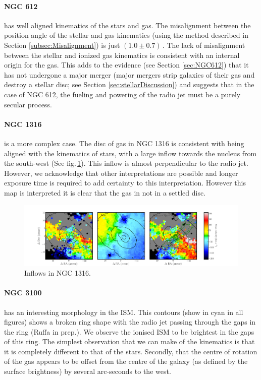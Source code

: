 	\paragraph{NGC 612} has well aligned kinematics of the stars and gas. The misalignment between the position angle of the stellar and gas kinematics (using the method described in Section \ref{subsec:Misalignment}) is just $(1.0\pm0.7)$\,\degree. The lack of misalignment between the stellar and ionized gas kinematics is consistent with an internal origin for the gas. This adds to the evidence (see Section \ref{sec:NGC612}) that it has not undergone a major merger (major mergers strip galaxies of their gas and destroy a stellar disc; see Section \ref{sec:stellarDiscussion}) and suggests that in the case of NGC 612, the fueling and powering of the radio jet must be a purely secular process. 


	\paragraph{NGC 1316} is a more complex case. The disc of gas in NGC 1316 is consistent with being aligned with the kinematics of stars, with a large inflow towards the nucleus from the south-west (See fig.\,\ref{fig:Inflow}). This inflow is almost perpendicular to the radio jet. However, we acknowledge that other interpretations are possible and longer exposure time is required to add certainty to this interpretation. However this map is interpreted it is clear that the gas in not in a settled disc. 

	\begin{figure}
		\centering
		\includegraphics[width=\textwidth]{chapter5/ngc1316_inflow.png}
		\caption[Inflows in NGC 1316]{Inflows in NGC 1316.} 
		\label{fig:Inflow}
	\end{figure}


	\paragraph{NGC 3100} has an interesting morphology in the ISM. This  contours (show in cyan in all figures) shows a broken ring shape with the radio jet passing through the gaps in the ring (Ruffa in prep.). We observe the ionised ISM to be brightest in the gaps of this ring. The simplest observation that we can make of the kinematics is that it is completely different to that of the stars. Secondly, that the centre of rotation of the gas appears to be offset from the centre of the galaxy (as defined by the surface brightness) by several arc-seconds to the west. 

